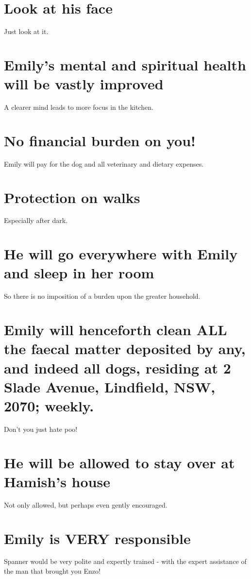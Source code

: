 \documentclass[12pt]{article}
\begin{document}
\begin{FlushLeft}




\section{Look at his face}
Just look at it. \\

\section{Emily's mental and spiritual health will be vastly improved}
A clearer mind leads to more focus in the kitchen.

\section{No financial burden on you!}
Emily will pay for the dog and all veterinary and dietary expenses.

\section{Protection on walks}
Especially after dark.

\section{He will go everywhere with Emily and sleep in her room}
So there is no imposition of a burden upon the greater household.

\section{Emily will henceforth clean ALL the faecal matter deposited by any, and indeed all dogs, residing at 2 Slade Avenue, Lindfield, NSW, 2070; weekly.}
Don't you just hate poo!

\section{He will be allowed to stay over at Hamish's house}
Not only allowed, but perhaps even gently encouraged.

\section{Emily is VERY responsible}
Spanner would be very polite and expertly trained - with the expert assistance of the man that brought you Enzo!


\end{FlushLeft}
\end{document}
